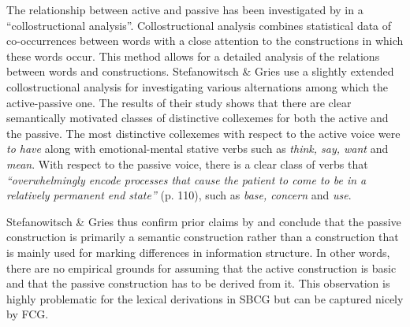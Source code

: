 The relationship between active and passive has been investigated by \citet{stefanowitsch03collostructions} in a ``collostructional analysis''. Collostructional analysis combines statistical data of co-occurrences between words with a close attention to the constructions in which these words occur. This method allows for a detailed analysis of the relations between words and constructions. Stefanowitsch \& Gries use a slightly extended collostructional analysis for investigating various alternations among which the active-passive one. The results of their study shows that there are clear semantically motivated classes of distinctive collexemes for both the active and the passive. The most distinctive collexemes with respect to the active voice were {\em to have} along with emotional-mental stative verbs such as {\em think, say, want} and {\em mean}. With respect to the passive voice, there is a clear class of verbs that {\em ``overwhelmingly encode processes that cause the patient to come to be in a relatively permanent end state''} (p. 110), such as {\em base, concern} and {\em use}.

Stefanowitsch \& Gries thus confirm prior claims by \citet{pinker89learnability} and conclude that the passive construction is primarily a semantic construction rather than a construction that is mainly used for marking differences in information structure. In other words, there are no empirical grounds for assuming that the active construction is basic and that the passive construction has to be derived from it. This observation is highly problematic for the lexical derivations in SBCG but can be captured nicely by FCG.


